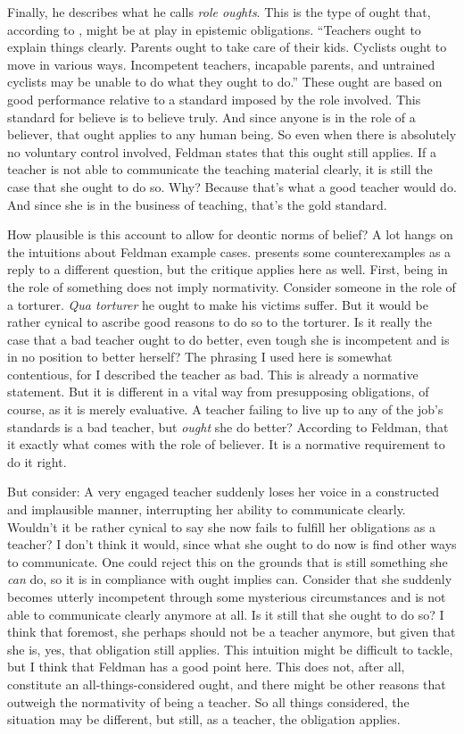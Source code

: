 \documentclass[12pt,numbers=noenddot]{scrartcl}
\begin{document}
Finally, he describes what he calls \emph{role oughts}. This is the type of ought that, according to \textcite[676]{Feldman2001-FELVBA}, might be at play in epistemic obligations. “Teachers ought to explain things clearly. Parents ought to take care of their kids. Cyclists ought to move in various ways. Incompetent teachers, incapable parents, and untrained cyclists may be unable to do what they ought to do.” These ought are based on good performance relative to a standard imposed by the role involved. This standard for believe is to believe truly. And since anyone is in the role of a believer, that ought applies to any human being. So even when there is absolutely no voluntary control involved, Feldman states that this ought still applies. If a teacher is not able to communicate the teaching material clearly, it is still the case that she ought to do so. Why? Because that's what a good teacher would do. And since she is in the business of teaching, that's the gold standard.

How plausible is this account to allow for deontic norms of belief? A lot hangs on the intuitions about Feldman example cases.
\textcite[9]{Cote-BouchardForthcoming-CTBCTA} presents some counterexamples as a reply to a different question, but the critique applies here as well. First, being in the role of something does not imply normativity. Consider someone in the role of a torturer. \emph{Qua torturer} he ought to make his victims suffer. But it would be rather cynical to ascribe good reasons to do so to the torturer. Is it really the case that a bad teacher ought to do better, even tough she is incompetent and is in no position to better herself? The phrasing I used here is somewhat contentious, for I described the teacher as bad. This is already a normative statement. But it is different in a vital way from presupposing obligations, of course, as it is merely evaluative. A teacher failing to live up to any of the job's standards is a bad teacher, but \emph{ought} she do better? According to Feldman, that it exactly what comes with the role of believer. It is a normative requirement to do it right.

But consider: A very engaged teacher suddenly loses her voice in a constructed and implausible manner, interrupting her ability to communicate clearly. Wouldn't it be rather cynical to say she now fails to fulfill her obligations as a teacher? I don't think it would, since what she ought to do now is find other ways to communicate. One could reject this on the grounds that is still something she \emph{can} do, so it is in compliance with ought implies can. Consider that she suddenly becomes utterly incompetent through some mysterious circumstances and is not able to communicate clearly anymore at all. Is it still that she ought to do so? I think that foremost, she perhaps should not be a teacher anymore, but given that she is, yes, that obligation still applies. This intuition might be difficult to tackle, but I think that Feldman has a good point here. This does not, after all, constitute an all-things-considered ought, and there might be other reasons that outweigh the normativity of being a teacher. So all things considered, the situation may be different, but still, as a teacher, the obligation applies.
\end{document}

